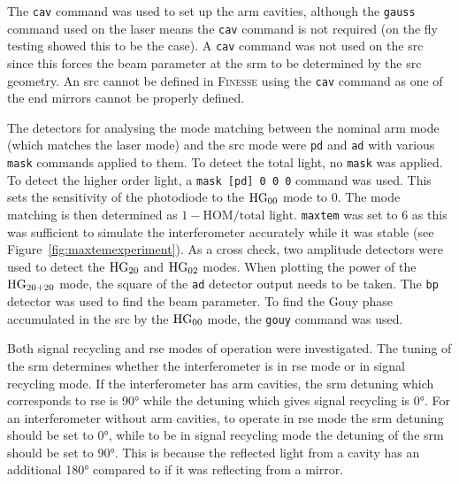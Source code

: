 \par
The \texttt{cav} command was used to set up the arm cavities, although the \texttt{gauss} command used on the laser means the \texttt{cav} command is not required (on the fly testing showed this to be the case). A \texttt{cav} command was not used on the \gls{src} since this forces the beam parameter at the \gls{srm} to be determined by the \gls{src} geometry. An \gls{src} cannot be defined in \textsc{Finesse} using the \texttt{cav} command as one of the end mirrors cannot be properly defined.
\par
The detectors for analysing the mode matching between the nominal arm mode (which matches the laser mode) and the \gls{src} mode were \texttt{pd} and \texttt{ad} with various \texttt{mask} commands applied to them. To detect the total light, no \texttt{mask} was applied. To detect the higher order light, a \texttt{mask [pd] 0 0 0} command was used. This sets the sensitivity of the photodiode to the $\rm{HG}_{00}$ mode to 0. The mode matching is then determined as $1 - \text{HOM}/\text{total light}$. \texttt{maxtem} was set to 6 as this was sufficient to simulate the interferometer accurately while it was stable (see Figure~\ref{fig:maxtemexperiment}). As a cross check, two amplitude detectors were used to detect the $\rm{HG}_{20}$ and $\rm{HG}_{02}$ modes. When plotting the power of the $\rm{HG}_{20+20}$ mode, the square of the \texttt{ad} detector output needs to be taken. The \texttt{bp} detector was used to find the beam parameter. To find the Gouy phase accumulated in the \gls{src} by the $\rm{HG}_{00}$ mode, the \texttt{gouy} command was used.
\par
Both signal recycling and \gls{rse} modes of operation were investigated. The tuning of the \gls{srm} determines whether the interferometer is in \gls{rse} mode or in signal recycling mode. If the interferometer has arm cavities, the \gls{srm} detuning which corresponds to \gls{rse} is 90\si{\degree} while the detuning which gives signal recycling is 0\si{\degree}. For an interferometer without arm cavities, to operate in \gls{rse} mode the \gls{srm} detuning should be set to 0\si{\degree}, while to be in signal recycling mode the detuning of the \gls{srm} should be set to 90\si{\degree}. This is because the reflected light from a cavity has an additional \ang{180} compared to if it was reflecting from a mirror. 
